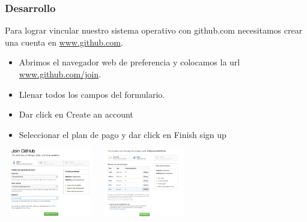 \documentclass[8pt]{beamer}
\begin{document}
\begin{frame}
\frametitle{Desarrollo}


Para lograr vincular nuestro sistema operativo con github.com necesitamos crear una cuenta en \url{www.github.com}. 
\setlength{\parskip}{03pt}
\begin{center}
\begin{itemize}
\item{Abrimos el navegador web de preferencia y colocamos la url \url{www.github.com/join}.}
\item{Llenar todos los campos del formulario.}
\item{Dar click en Create an account}
\item{Seleccionar el plan de pago y dar click en Finish sign up}
\end{itemize} 

\setlength{\parskip}{08pt}
\includegraphics[width=4cm, height=3cm]{img/uno} \hspace{0.5cm}
\includegraphics[width=4cm, height=3cm]{img/dos}
\end{center}
\end{frame}
\end{document}
